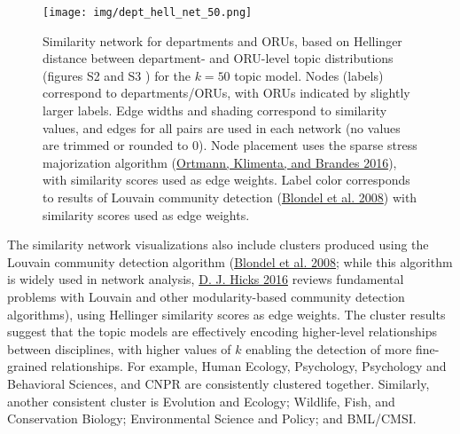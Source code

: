 \documentclass[
  11pt,
]{article}
\begin{document}
\begin{figure}
\centering
\texttt{[image: img/dept\_hell\_net\_50.png]}
\caption{Similarity network for departments and ORUs, based on Hellinger distance between department- and ORU-level topic distributions (figures S2 and S3 ) for the \(k=50\) topic model. Nodes (labels) correspond to departments/ORUs, with ORUs indicated by slightly larger labels. Edge widths and shading correspond to similarity values, and edges for all pairs are used in each network (no values are trimmed or rounded to 0). Node placement uses the sparse stress majorization algorithm (\protect\hyperlink{ref-OrtmannSparseStressModel2016}{Ortmann, Klimenta, and Brandes 2016}), with similarity scores used as edge weights. Label color corresponds to results of Louvain community detection (\protect\hyperlink{ref-BlondelFastUnfoldingCommunities2008}{Blondel et al. 2008}) with similarity scores used as edge weights. \label{fig.dept_hell_net_50}}
\end{figure}

The similarity network visualizations also include clusters produced using the Louvain community detection algorithm (\protect\hyperlink{ref-BlondelFastUnfoldingCommunities2008}{Blondel et al. 2008}; while this algorithm is widely used in network analysis, \protect\hyperlink{ref-HicksBibliometricsSocialValidation2016}{D. J. Hicks 2016} reviews fundamental problems with Louvain and other modularity-based community detection algorithms), using Hellinger similarity scores as edge weights. The cluster results suggest that the topic models are effectively encoding higher-level relationships between disciplines, with higher values of \(k\) enabling the detection of more fine-grained relationships. For example, Human Ecology, Psychology, Psychology and Behavioral Sciences, and CNPR are consistently clustered together. Similarly, another consistent cluster is Evolution and Ecology; Wildlife, Fish, and Conservation Biology; Environmental Science and Policy; and BML/CMSI.
\end{document}
